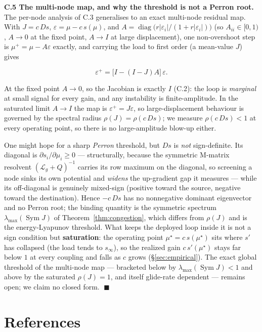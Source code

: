 \documentclass[11pt]{article}
\theoremstyle{plain}
\numberwithin{equation}{section}
\begin{document}
\textbf{C.5 The multi-node map, and why the threshold is not a Perron root.} The per-node analysis of C.3 generalises to an exact multi-node residual map. With $J=c\,Ds$, $\varepsilon=\mu-c\,s(\mu)$, and $A=\operatorname{diag}\!\big(r|\varepsilon_i|/(1+r|\varepsilon_i|)\big)$ (so $A_{ii}\in[0,1)$, $A\to0$ at the fixed point, $A\to I$ at large displacement), one non-overshoot step is $\mu^+=\mu-A\varepsilon$ exactly, and carrying the load to first order (a mean-value $J$) gives

\[
\varepsilon^+=\big[I-(I-J)A\big]\,\varepsilon .
\]

At the fixed point $A\to0$, so the Jacobian is exactly $I$ (C.2): the loop is \emph{marginal} at small signal for every gain, and any instability is finite-amplitude. In the saturated limit $A\to I$ the map is $\varepsilon^+=J\varepsilon$, so large-displacement behaviour is governed by the spectral radius $\rho(J)=\rho(c\,Ds)$; we measure $\rho(c\,Ds)<1$ at every operating point, so there is no large-amplitude blow-up either.

One might hope for a sharp \emph{Perron} threshold, but $Ds$ is \emph{not} sign-definite. Its diagonal is $\partial s_i/\partial\mu_i\ge0$ — structurally, because the symmetric M-matrix resolvent $(\mathcal{L}_g+Q)^{-1}$ carries its row maximum on the diagonal, so screening a node sinks its own potential and \emph{widens} the up-gradient gap it measures — while its off-diagonal is genuinely mixed-sign (positive toward the source, negative toward the destination). Hence $-c\,Ds$ has no nonnegative dominant eigenvector and no Perron root; the binding quantity is the symmetric spectrum $\lambda_{\max}(\operatorname{Sym}J)$ of Theorem~\ref{thm:congestion}, which differs from $\rho(J)$ and is the energy-Lyapunov threshold. What keeps the deployed loop inside it is not a sign condition but \textbf{saturation}: the operating point $\mu^\star=c\,s(\mu^\star)$ sits where $s'$ has collapsed (the load tends to $s_\infty$), so the realized gain $c\,s'(\mu^\star)$ stays far below $1$ at every coupling and falls as $c$ grows (§\ref{sec:empirical}). The exact global threshold of the multi-node map — bracketed below by $\lambda_{\max}(\operatorname{Sym}J)<1$ and above by the saturated $\rho(J)=1$, and itself glide-rate dependent — remains open; we claim no closed form. $\;\blacksquare$

\section*{References}
\end{document}
